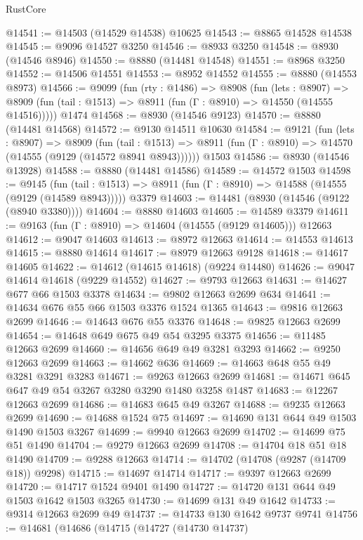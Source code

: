 \begin{lexlean}{RustCore}
\begin{coremodule}
@14541 := @14503 (@14529 @14538) @10625
@14543 := @8865 @14528 @14538
@14545 := @9096 @14527 @3250
@14546 := @8933 @3250
@14548 := @8930 (@14546 @8946)
@14550 := @8880 (@14481 @14548)
@14551 := @8968 @3250
@14552 := @14506 @14551
@14553 := @8952 @14552
@14555 := @8880 (@14553 @8973)
@14566 := @9099
    (fun (rty : @1486) =>
    @8908
      (fun (lets : @8907) =>
      @8909 (fun (tail : @1513) => @8911 (fun (Γ : @8910) => @14550 (@14555 @14516)))))
    @1474
@14568 := @8930 (@14546 @9123)
@14570 := @8880 (@14481 @14568)
@14572 := @9130 @14511 @10630
@14584 := @9121
    (fun (lets : @8907) =>
    @8909
      (fun (tail : @1513) =>
      @8911 (fun (Γ : @8910) => @14570 (@14555 (@9129 (@14572 @8941 @8943))))))
    @1503
@14586 := @8930 (@14546 @13928)
@14588 := @8880 (@14481 @14586)
@14589 := @14572 @1503
@14598 := @9145
    (fun (tail : @1513) => @8911 (fun (Γ : @8910) => @14588 (@14555 (@9129 (@14589 @8943)))))
    @3379
@14603 := @14481 (@8930 (@14546 (@9122 (@8940 @3380))))
@14604 := @8880 @14603
@14605 := @14589 @3379
@14611 := @9163 (fun (Γ : @8910) => @14604 (@14555 (@9129 @14605))) @12663
@14612 := @9047 @14603
@14613 := @8972 @12663
@14614 := @14553 @14613
@14615 := @8880 @14614
@14617 := @8979 @12663 @9128
@14618 := @14617 @14605
@14622 := @14612 (@14615 @14618) (@9224 @14480)
@14626 := @9047 @14614 @14618 (@9229 @14552)
@14627 := @9793 @12663
@14631 := @14627 @677 @66 @1503 @3378
@14634 := @9802 @12663 @2699 @634
@14641 := @14634 @676 @55 @66 @1503 @3376 @1524 @1365
@14643 := @9816 @12663 @2699
@14646 := @14643 @676 @55 @3376
@14648 := @9825 @12663 @2699
@14654 := @14648 @649 @675 @49 @54 @3295 @3375
@14656 := @11485 @12663 @2699
@14660 := @14656 @649 @49 @3281 @3293
@14662 := @9250 @12663 @2699
@14663 := @14662 @636
@14669 := @14663 @648 @55 @49 @3281 @3291 @3283
@14671 := @9263 @12663 @2699
@14681 := @14671 @645 @647 @49 @54 @3267 @3280 @3290 @1480 @3258 @1487
@14683 := @12267 @12663 @2699
@14686 := @14683 @645 @49 @3267
@14688 := @9235 @12663 @2699
@14690 := @14688 @1524 @75
@14697 := @14690 @131 @644 @49 @1503 @1490 @1503 @3267
@14699 := @9940 @12663 @2699
@14702 := @14699 @75 @51 @1490
@14704 := @9279 @12663 @2699
@14708 := @14704 @18 @51 @18 @1490
@14709 := @9288 @12663
@14714 := @14702 (@14708 (@9287 (@14709 @18)) @9298)
@14715 := @14697 @14714
@14717 := @9397 @12663 @2699
@14720 := @14717 @1524 @9401 @1490
@14727 := @14720 @131 @644 @49 @1503 @1642 @1503 @3265
@14730 := @14699 @131 @49 @1642
@14733 := @9314 @12663 @2699 @49
@14737 := @14733 @130 @1642 @9737 @9741
@14756 := @14681
    (@14686
      (@14715
        (@14727
          (@14730 @14737)

\end{coremodule}
\end{lexlean}
